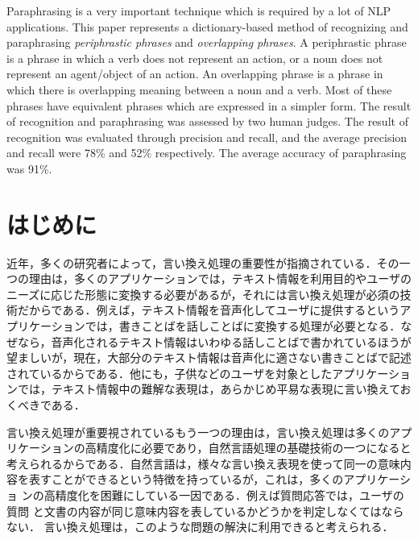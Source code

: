 \documentclass{nlp}
\begin{document}


\begin{eabstract}
 Paraphrasing is a very important technique which is required by a lot of
 NLP applications. This paper represents a dictionary-based method of
 recognizing and paraphrasing {\it periphrastic phrases} and {\it
 overlapping phrases}. A periphrastic phrase is a phrase in which a verb
 does not represent an action, or a noun does not represent an
 agent/object of an action. An overlapping phrase is a phrase in which
 there is overlapping meaning between a noun and a verb. Most of these
 phrases have equivalent phrases which are expressed in a simpler
 form. The result of recognition and paraphrasing was assessed by two
 human judges. The result of recognition was evaluated through precision
 and recall, and the average precision and recall were 78\% and 52\%
 respectively. The average accuracy of paraphrasing was 91\%.
\end{eabstract}


\maketitle

\section{はじめに}
近年，多くの研究者によって，言い換え処理の重要性が指摘されている．その一
つの理由は，多くのアプリケーションでは，テキスト情報を利用目的やユーザの
ニーズに応じた形態に変換する必要があるが，それには言い換え処理が必須の技
術だからである．例えば，テキスト情報を音声化してユーザに提供するというア
プリケーションでは，書きことばを話しことばに変換する処理が必要となる．な
ぜなら，音声化されるテキスト情報はいわゆる話しことばで書かれているほうが
望ましいが，現在，大部分のテキスト情報は音声化に適さない書きことばで記述
されているからである．他にも，子供などのユーザを対象としたアプリケーショ
ンでは，テキスト情報中の難解な表現は，あらかじめ平易な表現に言い換えてお
くべきである．

言い換え処理が重要視されているもう一つの理由は，言い換え処理は多くのアプ
リケーションの高精度化に必要であり，自然言語処理の基礎技術の一つになると
考えられるからである．自然言語は，様々な言い換え表現を使って同一の意味内
容を表すことができるという特徴を持っているが，これは，多くのアプリケーショ
ンの高精度化を困難にしている一因である．例えば質問応答では，ユーザの質問
と文書の内容が同じ意味内容を表しているかどうかを判定しなくてはならない．
言い換え処理は，このような問題の解決に利用できると考えられる．
\end{document}
